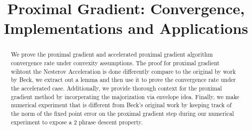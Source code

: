 \documentclass[]{article}
\theoremstyle{definition}
\begin{document}
\title{Proximal Gradient: Convergence, Implementations and Applications}
\maketitle
\begin{abstract}
    We prove the proximal gradient and accelerated proximal gradient algorithm convergence rate under convexity assumptions. The proof for proximal gradient wihtout the Nesterov Acceleration is done differently compare to the original by work by Beck\cite{paper:FISTA}, we extract out a lemma and then use it to prove the convergence rate under the accelerated case. Additionally, we provide thorough context for the proximal gradient method by incorperating the majorization via envelope idea. Finally, we make numerical experiment that is different from Beck's original work by keeping track of the norm of the fixed point error on the proximal gradient step during our numerical experiment to expose a 2 phrase descent property. 
\end{abstract}

\end{document}
